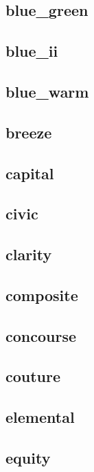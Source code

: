 \subsection{\ttfamily blue\_green}
\newpage
\subsection{\ttfamily blue\_ii}
\newpage
\subsection{\ttfamily blue\_warm}
\newpage
\subsection{\ttfamily breeze}
\newpage
\subsection{\ttfamily capital}
\newpage
\subsection{\ttfamily civic}
\newpage
\subsection{\ttfamily clarity}
\newpage
\subsection{\ttfamily composite}
\newpage
\subsection{\ttfamily concourse}
\newpage
\subsection{\ttfamily couture}
\newpage
\subsection{\ttfamily elemental}
\newpage
\subsection{\ttfamily equity}
\newpage
